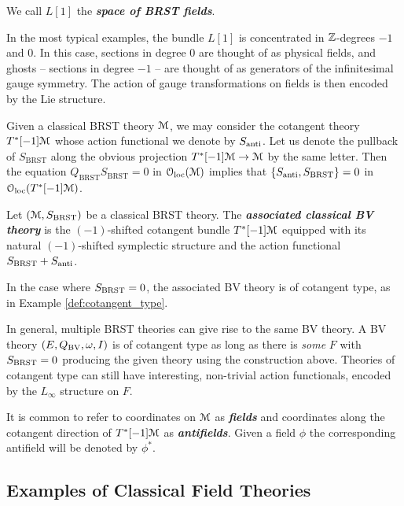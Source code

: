 \documentclass[10pt, oneside]{article}
\newcommand{\defterm}[1]{\textbf{\emph{#1}}}
\begin{document}
We call $L[1]$ the \defterm{space of BRST fields}.

\begin{remark}
In the most typical examples, the bundle $L[1]$ is concentrated in $\mathbb Z$-degrees $-1$ and 0.  In this case, sections in degree 0 are thought of as physical fields, and ghosts -- sections in degree $-1$ -- are thought of as generators of the infinitesimal gauge symmetry.  The action of gauge transformations on fields is then encoded by the Lie structure.
\end{remark}


Given a classical BRST theory $\mathcal M$, we may consider the cotangent theory $T^*[-1]\mathcal M$ whose action functional we denote by $S_{\rm anti}$.
Let us denote the pullback of $S_{\mathrm{BRST}}$ along the obvious projection $T^*[-1]\mathcal M\rightarrow \mathcal M$ by the same letter. Then the equation $Q_{\mathrm{BRST}} S_{\mathrm{BRST}} = 0$ in $\mathcal{O}_{\rm loc}(\mathcal M)$ implies that $\{S_{\rm anti}, S_{\mathrm{BRST}}\} = 0$ in $\mathcal{O}_{\rm loc}(T^*[-1]\mathcal M)$.

\begin{definition}
Let $(\mathcal M, S_{\mathrm{BRST}})$ be a classical BRST theory. The \defterm{associated classical BV theory} is the $(-1)$-shifted cotangent bundle $T^*[-1]\mathcal M$ equipped with its natural $(-1)$-shifted symplectic structure and the action functional $S_{\mathrm{BRST}} + S_{\rm anti}$.
\end{definition}

In the case where $S_{\mathrm{BRST}} = 0$, the associated BV theory is of cotangent type, as in Example \ref{def:cotangent_type}.

\begin{remark}
In general, multiple BRST theories can give rise to the same BV theory.  A BV theory $(E, Q_{\mathrm{BV}}, \omega, I)$ is of cotangent type as long as there is \emph{some} $F$ with $S_{\mathrm{BRST}} = 0$ producing the given theory using the construction above.  Theories of cotangent type can still have interesting, non-trivial action functionals, encoded by the $L_\infty$ structure on $F$.
\end{remark}

\begin{remark}
It is common to refer to coordinates on $\mathcal M$ as \defterm{fields} and coordinates along the cotangent direction of $T^*[-1]\mathcal M$ as \defterm{antifields}. Given a field $\phi$ the corresponding antifield will be denoted by $\phi^*$.
\end{remark}

\subsection{Examples of Classical Field Theories}
\end{document}
